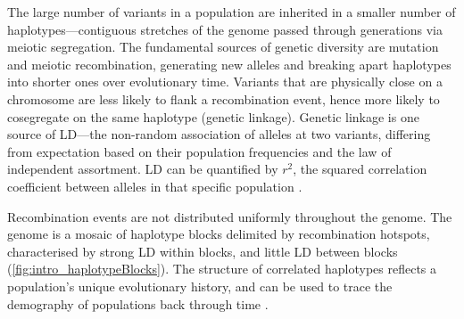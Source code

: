 \begin{outline}
The large number of variants in a population are inherited in a smaller number of haplotypes---contiguous stretches of the genome passed through generations via meiotic segregation.
The fundamental sources of genetic diversity are mutation and meiotic recombination, generating new alleles and breaking apart haplotypes into shorter ones over evolutionary time.
Variants that are physically close on a chromosome are less likely to flank a recombination event, hence more likely to cosegregate on the same haplotype (genetic linkage).
Genetic linkage is one source of \gls{LD}---the non-random association of alleles at two variants, differing from expectation based on their population frequencies and the law of independent assortment.
\gls{LD} can be quantified by $r^2$, the squared correlation coefficient between alleles in that specific population \autocite{slatkin2008LinkageDisequilibriumUnderstanding}.

Recombination events are not distributed uniformly throughout the genome.
The genome is a mosaic of haplotype blocks delimited by recombination hotspots, 
characterised by strong \gls{LD} within blocks, and little \gls{LD} between blocks \autocite{wall2003HaplotypeBlocksLinkage,theinternationalhapmapconsortium2007SecondGenerationHuman} (\cref{fig:intro_haplotypeBlocks}).
The structure of correlated haplotypes reflects a population's unique evolutionary history, and can be used to trace the demography of populations back through time \autocite{karczewski2020AnalyticTranslationalGenetics}.


\end{outline}
